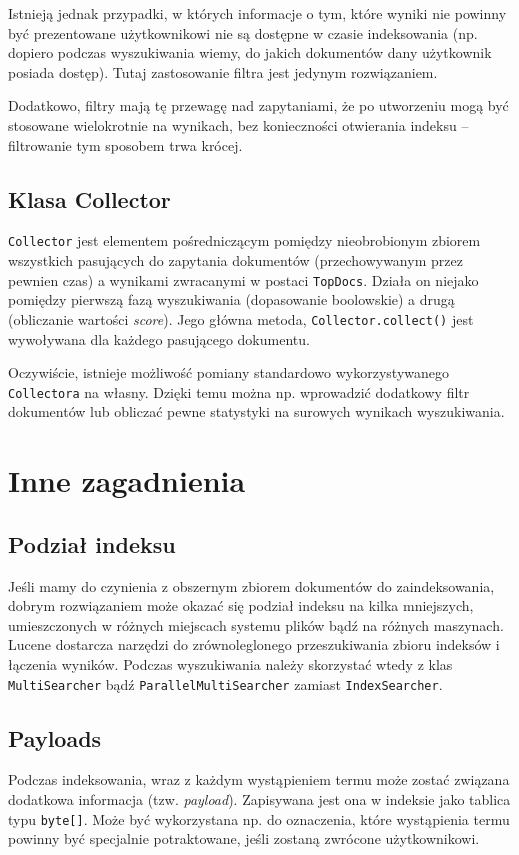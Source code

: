 Istnieją jednak przypadki, w których informacje o tym, które wyniki nie powinny być prezentowane użytkownikowi nie są dostępne w czasie indeksowania (np. dopiero podczas wyszukiwania wiemy, do jakich dokumentów dany użytkownik posiada dostęp). Tutaj zastosowanie filtra jest jedynym rozwiązaniem. 

Dodatkowo, filtry mają tę przewagę nad zapytaniami, że po utworzeniu mogą być stosowane wielokrotnie na wynikach, bez konieczności otwierania indeksu -- filtrowanie tym sposobem trwa krócej. 

\subsection{Klasa Collector}

\texttt{Collector} jest elementem pośredniczącym pomiędzy nieobrobionym zbiorem wszystkich pasujących do zapytania dokumentów (przechowywanym przez pewnien czas) a wynikami zwracanymi w postaci \texttt{TopDocs}. Działa on niejako pomiędzy pierwszą fazą wyszukiwania (dopasowanie boolowskie) a drugą (obliczanie wartości \emph{score}). Jego główna metoda, \texttt{Collector.collect()} jest wywoływana dla każdego pasującego dokumentu. 

Oczywiście, istnieje możliwość pomiany standardowo wykorzystywanego \texttt{Collectora} na własny. Dzięki temu można np. wprowadzić dodatkowy filtr dokumentów lub obliczać pewne statystyki na surowych wynikach wyszukiwania.

\section{Inne zagadnienia}

\subsection{Podział indeksu}

Jeśli mamy do czynienia z obszernym zbiorem dokumentów do zaindeksowania, dobrym rozwiązaniem może okazać się podział indeksu na kilka mniejszych, umieszczonych w różnych miejscach systemu plików bądź na różnych maszynach. Lucene dostarcza narzędzi do zrównoleglonego przeszukiwania zbioru indeksów i łączenia wyników. Podczas wyszukiwania należy skorzystać wtedy z klas \texttt{MultiSearcher} bądź \texttt{ParallelMultiSearcher} zamiast \texttt{IndexSearcher}.

\subsection{Payloads}

Podczas indeksowania, wraz z każdym wystąpieniem termu może zostać związana dodatkowa informacja (tzw. \emph{payload}). Zapisywana jest ona w indeksie jako tablica typu \texttt{byte[]}. Może być wykorzystana np. do oznaczenia, które wystąpienia termu powinny być specjalnie potraktowane, jeśli zostaną zwrócone użytkownikowi.